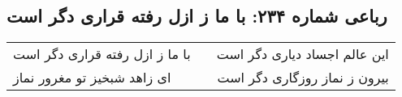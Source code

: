 \begin{center}
\section*{رباعی شماره ۲۳۴: با ما ز ازل رفته قراری دگر است}
\label{sec:0234}
\begin{longtable}{l p{0.5cm} r}
با ما ز ازل رفته قراری دگر است
&&
این عالم اجساد دیاری دگر است
\\
ای زاهد شبخیز تو مغرور نماز
&&
بیرون ز نماز روزگاری دگر است
\\
\end{longtable}
\end{center}
